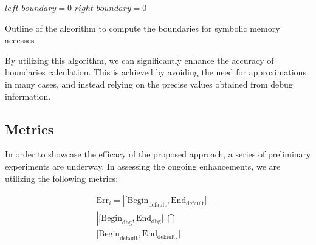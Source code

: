 \documentclass[conference]{IEEEtran}
\begin{document}
\begin{algorithm}
    $left\_boundary = 0$\;
    $right\_boundary = 0$\;

    \caption{Outline of the algorithm to compute the boundaries for symbolic memory accesses}
\end{algorithm}

By utilizing this algorithm, we can significantly enhance the accuracy of boundaries calculation. This is achieved by avoiding the need for approximations in many cases, and instead relying on the precise values obtained from debug information.

\subsection{Metrics}

In order to showcase the efficacy of the proposed approach, a series of preliminary experiments are underway. In assessing the ongoing enhancements, we are utilizing the following metrics:

\begin{equation}
    \begin{aligned}
        \text{Err}_i= | \lbrack \text{Begin}_\text{default}, \text{End}_\text{default} \rbrack | - \\
        {|\lbrack \text{Begin}_\text{dbg}, \text{End}_\text{dbg}\rbrack|} \bigcap                  \\
        {\lbrack \text{Begin}_\text{default}, \text{End}_\text{default} \rbrack|}
    \end{aligned}
\end{equation}
\end{document}

